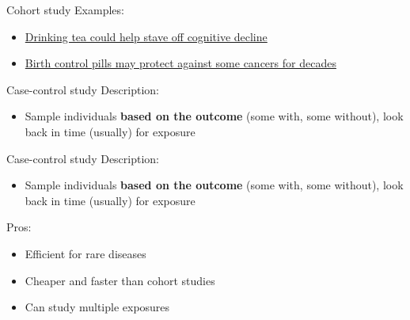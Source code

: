 \documentclass[10pt,t]{beamer}
\begin{document}
\begin{frame}[c]{Cohort study}
Examples:
\vspace{0.3cm}

\begin{itemize}
	\item \href{https://www.medicalnewstoday.com/articles/316619.php}{\color{cyan} Drinking tea could help stave off cognitive decline}
	\item \href{https://www.medicalnewstoday.com/articles/316565.php}{\color{cyan} Birth control pills may protect against some cancers for decades}
\end{itemize}



\end{frame}

\begin{frame}{Case-control study}
	\vspace{-5 mm}
Description:
\begin{itemize}
	\item Sample individuals \textbf{based on the outcome} (some with, some without), look back in time (usually) for exposure
\end{itemize}
\end{frame}

\begin{frame}{Case-control study}
	\vspace{-5 mm}
Description:
\begin{itemize}
	\item Sample individuals \textbf{based on the outcome} (some with, some without), look back in time (usually) for exposure
\end{itemize}
Pros:
\begin{itemize}
	\item Efficient for rare diseases
	\item Cheaper and faster than cohort studies
	\item Can study multiple exposures
\end{itemize}
\end{frame}
\end{document}
